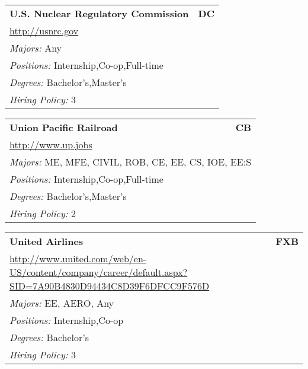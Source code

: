 \documentclass[twoside]{article}
\begin{document}
\begin{center}
\begin{multicols}{3}
\begin{FlushLeft}
\begin{minipage}{.9\columnwidth}
\end{minipage}
 
\begin{minipage}{.9\columnwidth}\begin{tabularx}{.95\columnwidth}{Xr}
                 {\Large\bf U.S. Nuclear Regulatory Commission} & {\Large\bf DC}\\
    \multicolumn{2}{p{.95\columnwidth}}{\url{http://usnrc.gov}}\\
    \multicolumn{2}{p{.95\columnwidth}}{\emph{Majors:} Any}\\
    \multicolumn{2}{p{.95\columnwidth}}{\emph{Positions:} Internship,Co-op,Full-time}\\
    \multicolumn{2}{p{.95\columnwidth}}{\emph{Degrees:} Bachelor's,Master's}\\
    \multicolumn{2}{p{.95\columnwidth}}{\emph{Hiring Policy:} 3}\\
    \end{tabularx}
    
\end{minipage}
 
\begin{minipage}{.9\columnwidth}\begin{tabularx}{.95\columnwidth}{Xr}
                 {\Large\bf Union Pacific Railroad} & {\Large\bf CB}\\
    \multicolumn{2}{p{.95\columnwidth}}{\url{http://www.up.jobs}}\\
    \multicolumn{2}{p{.95\columnwidth}}{\emph{Majors:} ME, MFE, CIVIL, ROB, CE, EE, CS, IOE, EE:S}\\
    \multicolumn{2}{p{.95\columnwidth}}{\emph{Positions:} Internship,Co-op,Full-time}\\
    \multicolumn{2}{p{.95\columnwidth}}{\emph{Degrees:} Bachelor's,Master's}\\
    \multicolumn{2}{p{.95\columnwidth}}{\emph{Hiring Policy:} 2}\\
    \end{tabularx}
    
\end{minipage}
 
\begin{minipage}{.9\columnwidth}\begin{tabularx}{.95\columnwidth}{Xr}
                 {\Large\bf United Airlines} & {\Large\bf FXB}\\
    \multicolumn{2}{p{.95\columnwidth}}{\url{http://www.united.com/web/en-US/content/company/career/default.aspx?SID=7A90B4830D94434C8D39F6DFCC9F576D}}\\
    \multicolumn{2}{p{.95\columnwidth}}{\emph{Majors:} EE, AERO, Any}\\
    \multicolumn{2}{p{.95\columnwidth}}{\emph{Positions:} Internship,Co-op}\\
    \multicolumn{2}{p{.95\columnwidth}}{\emph{Degrees:} Bachelor's}\\
    \multicolumn{2}{p{.95\columnwidth}}{\emph{Hiring Policy:} 3}\\
    \end{tabularx}
    

\end{minipage}
\end{FlushLeft}
\end{multicols}
\end{center}
\end{document}
